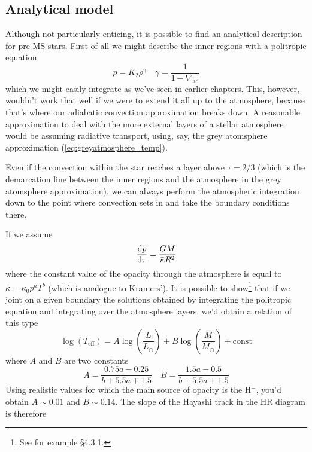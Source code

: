 \subsection{Analytical model}

Although not particularly enticing, it is possible to find an analytical description for pre-MS stars. First of all we might describe the inner regions with a politropic equation
\begin{equation*}
    p = K_{2}\rho^{\gamma} \quad \gamma = \frac{1}{1-\nabla_{\text{ad}}}
\end{equation*}
which we might easily integrate as we've seen in earlier chapters. This, however, wouldn't work that well if we were to extend it all up to the atmosphere, because that's where our adiabatic convection approximation breaks down. A reasonable approximation to deal with the more external layers of a stellar atmosphere would be assuming radiative transport, using, say, the grey atomsphere approximation (\ref{eq:greyatmosphere_temp}).
\par Even if the convection within the star reaches a layer above $\tau = 2/3$ (which is the demarcation line between the inner regions and the atmosphere in the grey atomsphere approximation), we can always perform the atmospheric integration down to the point where convection sets in and take the boundary conditions there.
\par If we assume 
\begin{equation*}
    \frac{\text{d}p}{\text{d}\tau} = \frac{GM}{\bar{\kappa}R^{2}}
\end{equation*}
where the constant value of the opacity through the atmosphere is equal to $\bar{\kappa} = \kappa_{0}p^{a}T^{b}$ (which is analogue to Kramers'). It is possible to show\footnote{See for example \cite{2005essp.book.....S} §4.3.1.} that if we joint on a given boundary the solutions obtained by integrating the politropic equation and integrating over the atmosphere layers, we'd obtain a relation of this type 
\begin{equation}
    \log(T_{\text{eff}}) = A\log\left(\frac{L}{L_{\odot}}\right)+B\log\left(\frac{M}{M_{\odot}}\right)+\text{const}
    \label{eq:luminosity_pre-ms}
\end{equation}
where $A$ and $B$ are two constants
\begin{equation*}
    A = \frac{0.75a-0.25}{b+5.5a+1.5} \quad B = \frac{1.5a-0.5}{b+5.5a+1.5}
\end{equation*}
Using realistic values for which the main source of opacity is the H$^{-}$, you'd obtain $A\sim 0.01$ and $B\sim 0.14$. The slope of the Hayashi track in the HR diagram is therefore 
